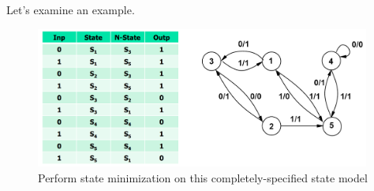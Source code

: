 \documentclass{article}
\begin{document}
\vspace{0.5cm}
Let's examine an example.

\begin{figure}[htp]
    \centering
    \includegraphics[width=11cm, scale=1]{S2/stateMinimization_CS.PNG}
    \caption{Perform state minimization on this completely-specified state model}
\end{figure}
\end{document}
